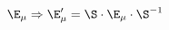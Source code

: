 \begin{equation}
\label{e5:39}
\E_{\mu} \Rightarrow \E'_{\mu} = \S \cdot \E_{\mu} \cdot \S^{-1}
\end{equation} 
